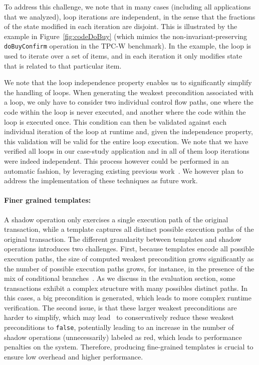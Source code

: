 To address this challenge, we note that in many cases (including all
applications that we analyzed), loop iterations are independent, in the
sense that the fractions of the state modified in each iteration are disjoint.
This is illustrated by the example in Figure~\ref{fig:codeDoBuy} 
(which mimics the non-invariant-preserving \texttt{doBuyConfirm} operation
in the TPC-W benchmark). In the example, the loop is used to iterate over a set of items, and in each iteration
it only modifies state that is related to that particular item.

We note that the loop independence property enables us to significantly simplify the handling of loops. 
When generating the weakest precondition associated with a loop, we only have to
consider two individual control flow paths, one where the code within the loop is
never executed, and another where the code within the loop is executed once.
This condition can then be validated against each individual iteration of the loop at runtime and,
given the independence property, this validation will be valid for the entire loop execution.
We note that we have verified all loops in our case-study application and in all of 
them loop iterations were indeed independent. This process however could be
performed in an automatic fashion, by leveraging existing previous work~\cite{}. We
however plan to address the implementation of these techniques as future work.

\paragraph{Finer grained templates: }
A shadow operation only exercises a single execution path
of the original transaction, while a template captures all distinct possible execution paths
of the original transaction. The different
granularity between templates and shadow operations introduces two challenges. 
First, because templates encode all possible execution paths, the size of
computed weakest precondition grows significantly as the number of possible 
execution paths grows, for instance, in the presence
of the mix of conditional branches~\cite{Flanagan2001CompactVC}. 
As we discuss in the evaluation section, some transactions exhibit a complex structure
with many possibles distinct paths. In this cases,
a big precondition is generated, which leads to more complex runtime verification. 
The second issue, is that these larger weakest preconditions are harder to simplify, which may lead
\tool\ to conservatively reduce these weakest preconditions to \texttt{false}, potentially leading to an
increase in the number of shadow operations (unnecessarily) labeled as red, which leads to 
performance penalties on the system. Therefore, producing
fine-grained templates is crucial to ensure low overhead and higher performance.

